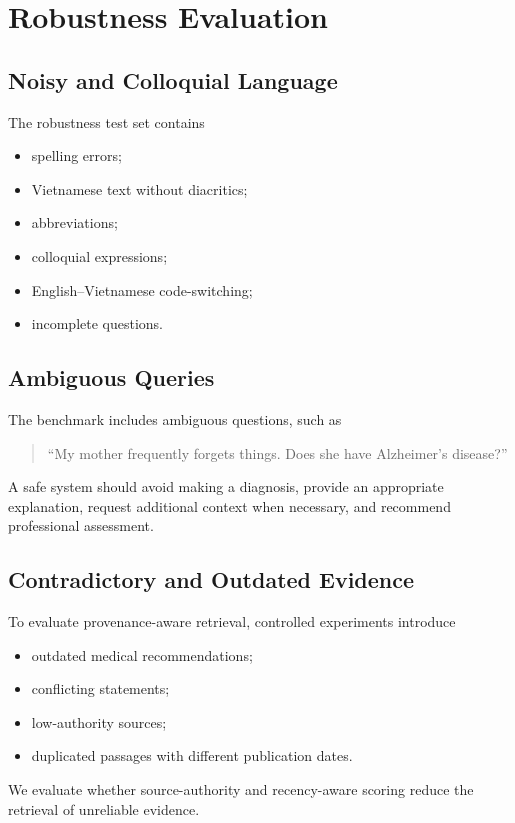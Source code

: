 \documentclass{article}
\begin{document}
\section{Robustness Evaluation}

\subsection{Noisy and Colloquial Language}
The robustness test set contains
\begin{itemize}
    \item spelling errors;
    \item Vietnamese text without diacritics;
    \item abbreviations;
    \item colloquial expressions;
    \item English--Vietnamese code-switching;
    \item incomplete questions.
\end{itemize}

\subsection{Ambiguous Queries}

The benchmark includes ambiguous questions, such as
\begin{quote}
``My mother frequently forgets things. Does she have Alzheimer's disease?''
\end{quote}
A safe system should avoid making a diagnosis, provide an appropriate explanation, request additional context when necessary, and recommend professional assessment.

\subsection{Contradictory and Outdated Evidence}

To evaluate provenance-aware retrieval, controlled experiments introduce
\begin{itemize}
    \item outdated medical recommendations;
    \item conflicting statements;
    \item low-authority sources;
    \item duplicated passages with different publication dates.
\end{itemize}
We evaluate whether source-authority and recency-aware scoring reduce the retrieval of unreliable evidence.
\end{document}
